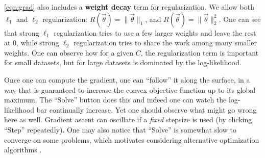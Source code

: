 \documentclass[11pt,letterpaper]{article}
\begin{document}
\eqref{eqn:grad} also includes a \textbf{weight decay} term for
regularization.  We allow both $\ell_1$ and $\ell_2$ regularization:
$R(\vec{\theta}) = \|\vec\theta\|_1$, and $R(\vec{\theta}) =
\|\vec{\theta}\|_2^2$.  One can see that strong $\ell_1$
regularization tries to use a few larger weights and leave the rest at
0, while strong $\ell_2$ regularization tries to share the work among
many smaller weights.  One can observe how for a given $C$, the
regularization term is important for small datasets, but for large
datasets is dominated by the log-likelihood.

%

Once one can compute the gradient, one can ``follow'' it along the
surface, in a way that is guaranteed to increase the convex objective
function up to its global maximum.  The ``Solve'' button does this and
indeed one can watch the log-likelihood bar continually increase.  Yet
one should observe what might go wrong here as well.  Gradient
ascent can oscillate if a {\em fixed} stepsize is used (by clicking
``Step'' repeatedly).  One may also notice that ``Solve'' is somewhat
slow to converge on some problems, which motivates considering
alternative optimization algorithms \cite{malouf2002comparison}.


%

\end{document}
